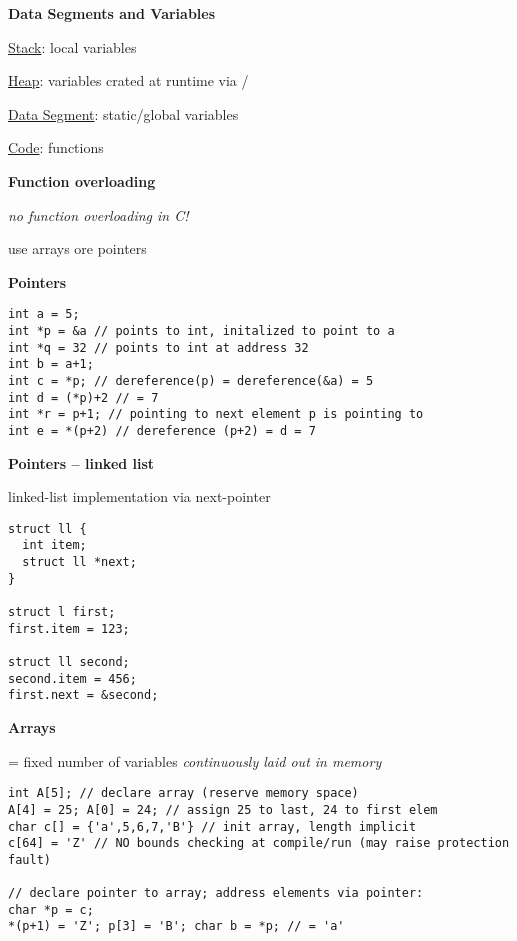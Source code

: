 \textbf{Data Segments and Variables}
\begin{items}
  \item \underline{Stack}: local variables
  \item \underline{Heap}: variables crated at runtime via /
  \item \underline{Data Segment}: static/global variables
  \item \underline{Code}: functions
\end{items}

\textbf{Function overloading}
\begin{items}
  \item \emph{no function overloading in C!}
  \item use arrays ore pointers
\end{items}

\textbf{Pointers}
\begin{lstlisting}[style=customc]
int a = 5;
int *p = &a // points to int, initalized to point to a
int *q = 32 // points to int at address 32
int b = a+1;
int c = *p; // dereference(p) = dereference(&a) = 5
int d = (*p)+2 // = 7
int *r = p+1; // pointing to next element p is pointing to
int e = *(p+2) // dereference (p+2) = d = 7
\end{lstlisting}

\textbf{Pointers -- linked list}
\begin{items}
  \item linked-list implementation via next-pointer
\end{items}
\begin{lstlisting}[style=customc]
struct ll {
  int item;
  struct ll *next;
}

struct l first;
first.item = 123;

struct ll second;
second.item = 456;
first.next = &second;
\end{lstlisting}

\newpage

\textbf{Arrays}
\begin{items}
  \item = fixed number of variables \emph{continuously laid out in memory}
\end{items}
\begin{lstlisting}[style=customc]
int A[5]; // declare array (reserve memory space)
A[4] = 25; A[0] = 24; // assign 25 to last, 24 to first elem
char c[] = {'a',5,6,7,'B'} // init array, length implicit
c[64] = 'Z' // NO bounds checking at compile/run (may raise protection fault)

// declare pointer to array; address elements via pointer:
char *p = c;
*(p+1) = 'Z'; p[3] = 'B'; char b = *p; // = 'a'
\end{lstlisting}

